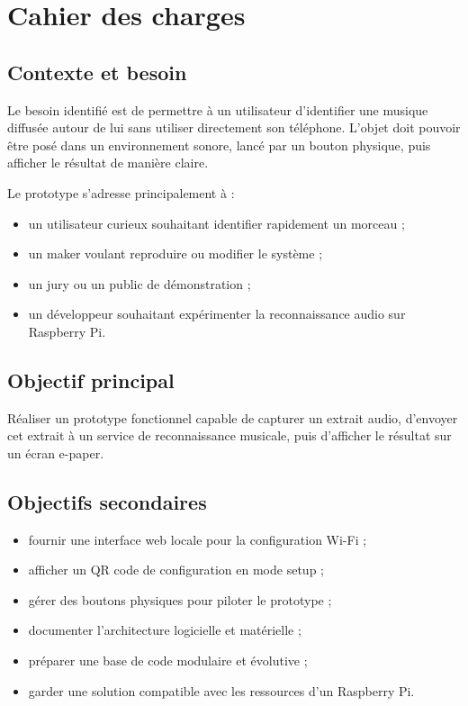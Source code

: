 \section{Cahier des charges}

\subsection{Contexte et besoin}

Le besoin identifié est de permettre à un utilisateur d'identifier une musique
diffusée autour de lui sans utiliser directement son téléphone. L'objet doit
pouvoir être posé dans un environnement sonore, lancé par un bouton physique,
puis afficher le résultat de manière claire.

Le prototype s'adresse principalement à :

\begin{itemize}
    \item un utilisateur curieux souhaitant identifier rapidement un morceau ;
    \item un maker voulant reproduire ou modifier le système ;
    \item un jury ou un public de démonstration ;
    \item un développeur souhaitant expérimenter la reconnaissance audio sur
    Raspberry Pi.
\end{itemize}

\subsection{Objectif principal}

Réaliser un prototype fonctionnel capable de capturer un extrait audio,
d'envoyer cet extrait à un service de reconnaissance musicale, puis d'afficher
le résultat sur un écran e-paper.

\subsection{Objectifs secondaires}

\begin{itemize}
    \item fournir une interface web locale pour la configuration Wi-Fi ;
    \item afficher un QR code de configuration en mode setup ;
    \item gérer des boutons physiques pour piloter le prototype ;
    \item documenter l'architecture logicielle et matérielle ;
    \item préparer une base de code modulaire et évolutive ;
    \item garder une solution compatible avec les ressources d'un Raspberry Pi.
\end{itemize}

